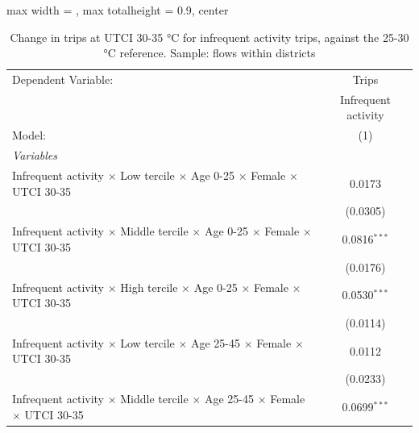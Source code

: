 
\begin{table}[htbp]
   \caption{\label{table_intersectionality_infrequent_activity_30-35} Change in trips at UTCI 30-35 °C for infrequent activity trips, against the 25-30 °C reference. Sample: flows within districts}
   \centering
   \small
   \begin{adjustbox}{max width = \textwidth, max totalheight = 0.9\textheight, center}
      \begin{tabular}{lc}
         \tabularnewline \midrule \midrule
         Dependent Variable:                                                                                     & Trips\\  
                                                                                                                 & Infrequent activity \\   
         Model:                                                                                                  & (1)\\  
         \midrule
         \emph{Variables}\\
         Infrequent activity $\times$ Low tercile $\times$ Age 0-25 $\times$ Female $\times$ UTCI 30-35          & 0.0173\\   
                                                                                                                 & (0.0305)\\   
         Infrequent activity $\times$ Middle tercile $\times$ Age 0-25 $\times$ Female $\times$ UTCI 30-35       & 0.0816$^{***}$\\   
                                                                                                                 & (0.0176)\\   
         Infrequent activity $\times$ High tercile $\times$ Age 0-25 $\times$ Female $\times$ UTCI 30-35         & 0.0530$^{***}$\\   
                                                                                                                 & (0.0114)\\   
         Infrequent activity $\times$ Low tercile $\times$ Age 25-45 $\times$ Female $\times$ UTCI 30-35         & 0.0112\\   
                                                                                                                 & (0.0233)\\   
         Infrequent activity $\times$ Middle tercile $\times$ Age 25-45 $\times$ Female $\times$ UTCI 30-35      & 0.0699$^{***}$\\   

\end{tabular}
\end{adjustbox}
\end{table}
